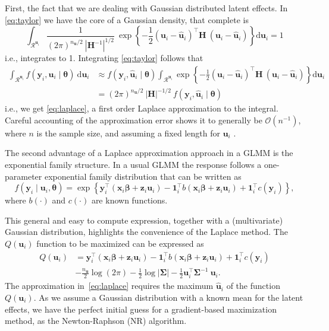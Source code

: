 First, the fact that we are dealing with Gaussian distributed latent
effects. In \autoref{eq:taylor} we have the core of a Gaussian density,
that complete is
\[
 \int_{\mathcal{R}^{\bm{u}_{i}}}
 \frac{1}{(2\pi)^{n_{\bm{u}}/2}~|\bm{H}^{-1}|^{1/2}}~\exp
 \left\{-\frac{1}{2} (\bm{u}_{i} - \bm{\hat{u}}_{i})^{\top}\bm{H}~
                     (\bm{u}_{i} - \bm{\hat{u}}_{i})
 \right\} \text{d} \bm{u}_{i} = 1
\]
i.e., integrates to 1. Integrating \autoref{eq:taylor} follows that
\begin{align*}
 \int_{\mathcal{R}^{\bm{u}_{i}}}
 f(\bm{y}_{i}, \bm{u}_{i} \mid \bm{\theta})~\text{d} \bm{u}_{i}
 &\approx f(\bm{y}_{i}, \bm{\hat{u}}_{i} \mid \bm{\theta})
  \int_{\mathcal{R}^{\bm{u}_{i}}}
  \exp \left\{-\frac{1}{2}
               (\bm{u}_{i} - \bm{\hat{u}}_{i})^{\top}\bm{H}~
               (\bm{u}_{i} - \bm{\hat{u}}_{i})
       \right\} \text{d} \bm{u}_{i}\\
 &= (2\pi)^{n_{\bm{u}}/2}~|\bm{H}|^{-1/2}~
    f(\bm{y}_{i}, \bm{\hat{u}}_{i} \mid \bm{\theta})
\end{align*}
i.e., we get \autoref{eq:laplace}, a first order Laplace approximation
to the integral. Careful accounting of the approximation error shows it
to generally be \(\mathcal{O}(n^{-1})\), where \(n\) is the sample size,
and assuming a fixed length for \(\bm{u}_{i}\) \cite{corestats}.

The second advantage of a Laplace approximation approach in a GLMM is
the exponential family structure. In a usual GLMM the response follows a
one-parameter exponential family distribution that can be written as
\[
 f(\bm{y}_{i} \mid \bm{u}_{i}, \bm{\theta}) =
 \exp \left\{
  \bm{y}_{i}^{\top} (\bm{x}_{i}\bm{\beta} + \bm{z}_{i}\bm{u}_{i}) -
  \bm{1}_{i}^{\top}b(\bm{x}_{i}\bm{\beta} + \bm{z}_{i}\bm{u}_{i}) +
  \bm{1}_{i}^{\top} c(\bm{y}_{i})
      \right\},
\]
where \(b(\cdot)\) and \(c(\cdot)\) are known functions.

This general and easy to compute expression, together with a
(multivariate) Gaussian distribution, highlights the convenience of the
Laplace method. The \(Q(\bm{u}_{i})\) function to be maximized can be
expressed as
\begin{equation}
 \begin{aligned}
  Q(\bm{u}_{i}) &=
  \bm{y}_{i}^{\top} (\bm{x}_{i}\bm{\beta} + \bm{z}_{i}\bm{u}_{i}) -
  \bm{1}_{i}^{\top}b(\bm{x}_{i}\bm{\beta} + \bm{z}_{i}\bm{u}_{i}) +
  \bm{1}_{i}^{\top} c(\bm{y}_{i})\\
  &- \frac{n_{\bm{u}}}{2} \log (2\pi) -
     \frac{1}{2} \log |\bm{\Sigma}| -
     \frac{1}{2} \bm{u}_{i}^{\top}\bm{\Sigma}^{-1}~\bm{u}_{i}.
 \end{aligned}
\end{equation}
The approximation in~\autoref{eq:laplace} requires the maximum
\(\bm{\hat{u}}_{i}\) of the function \(Q(\bm{u}_{i})\). As we assume a
Gaussian distribution with a known mean for the latent effects, we have
the perfect initial guess for a gradient-based maximization method, as
the Newton-Raphson (NR) algorithm.

